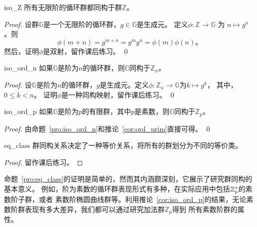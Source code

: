  \begin{proposition}{}{iso_Z}
     所有无限阶的循环群都同构于群$\mathbb{Z}$。
 \end{proposition}
     
 \begin{proof}
 	设群$\mathbb{G}$是一个无限阶的循环群，$g\in \mathbb{G}$是生成元。
 	定义$\phi\colon \mathbb{Z} \to \mathbb{G}$ 为 $n \mapsto g^n$。则
 	\[\phi(m+n) = g^{m+n} = g^m g^n = \phi(m)\phi(n)\text{。}\]
 	然后，证明$\phi$是双射，留作课后练习。 \qed
 \end{proof}

  \begin{proposition}{}{iso_ord_n}
		如果$\mathbb{G}$是阶为$n$的循环群，则$\mathbb{G}$同构于$\mathbb{Z}_n$。
  \end{proposition}
	
	\begin{proof}
		设$\mathbb{G}$是阶为$n$的循环群，$g$是生成元。定义$\phi\colon \mathbb{Z}_n \to \mathbb{G}$为$k \mapsto g^k$，
		其中，$0 \leq k < n$。 
		证明$\phi$是一种同构映射，留作课后练习。 \qed
	\end{proof}

	\begin{corollary}{}{iso_ord_p}
		如果$\mathbb{G}$是阶为$p$的有限群，其中$p$是素数，则$\mathbb{G}$同构于$\mathbb{Z}_p$。
	\end{corollary}
	
	\begin{proof}
		由命题~\ref{pro:iso_ord_n}和推论~\ref{cor:ord_prim}直接可得。 \qed
	\end{proof}

	\begin{proposition}{}{eq_class}
	群同构关系决定了一种等价关系，将所有的群划分为不同的等价类。
	\end{proposition}

\begin{proof}
	留作课后练习。
\end{proof}
命题~\ref{pro:eq_class}的证明是简单的，然而其内涵颇深刻，它展示了研究群同构的基本意义。
例如，阶为素数的循环群表现形式有多种，在实际应用中包括${\mathbb Z}_p^*$的素数阶子群，或者
素数阶椭圆曲线群等。利用推论~\ref{cor:iso_ord_p}的结果，无论素数阶群表现有多大差异，我们都可以通过研究加法群$\mathbb{Z}_p$得到
所有素数阶群的属性。
	
